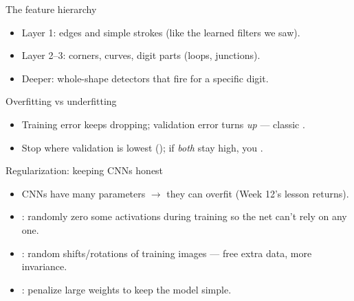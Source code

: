 \documentclass[10pt,aspectratio=169]{beamer}
\begin{document}
\begin{frame}{The feature hierarchy}
  \begin{itemize}
    \item Layer 1: edges and simple strokes (like the learned filters we saw).
    \item Layer 2--3: corners, curves, digit parts (loops, junctions).
    \item Deeper: whole-shape detectors that fire for a specific digit.
  \end{itemize}
\end{frame}

\begin{frame}{Overfitting vs underfitting}
  \begin{center}
  \end{center}
  \begin{itemize}
    \item Training error keeps dropping; validation error turns \emph{up} --- classic .
    \item Stop where validation is lowest (); if \emph{both} stay high, you .
  \end{itemize}
\end{frame}

\begin{frame}{Regularization: keeping CNNs honest}
  \begin{itemize}
    \item CNNs have many parameters $\rightarrow$ they can overfit (Week 12's lesson returns).
    \item {}: randomly zero some activations during training so the net can't rely on any one.
    \item {}: random shifts/rotations of training images --- free extra data, more invariance.
    \item {}: penalize large weights to keep the model simple.
  \end{itemize}
\end{frame}
\end{document}
